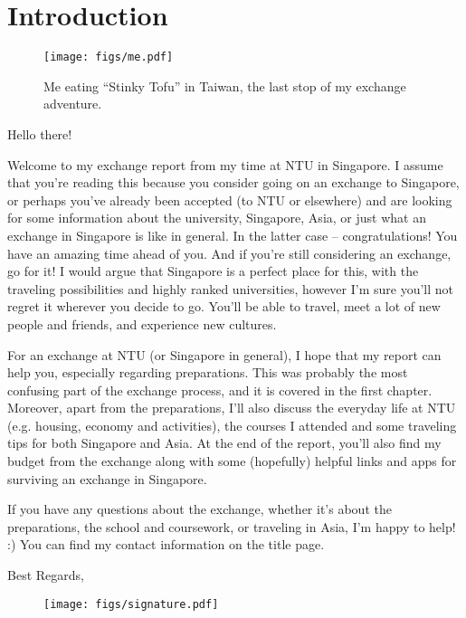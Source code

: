 \chapter*{Introduction}

\begin{wrapfigure}{r}{0.3\textwidth}
    \vspace{0.25cm}
    \centering
    \texttt{[image: figs/me.pdf]}
    \vspace{-0.15cm}
    \caption{Me eating ``Stinky Tofu'' in Taiwan, the last stop of my exchange adventure.}
    \vspace{-0.7cm}
\end{wrapfigure}
Hello there! 

Welcome to my exchange report from my time at NTU in Singapore. I assume that you're reading this because you consider going on an exchange to Singapore, or perhaps you've already been accepted (to NTU or elsewhere) and are looking for some information about the university, Singapore, Asia, or just what an exchange in Singapore is like in general. In the latter case -- congratulations! You have an amazing time ahead of you. And if you're still considering an exchange, go for it! I would argue that Singapore is a perfect place for this, with the traveling possibilities and highly ranked universities, however I'm sure you'll not regret it wherever you decide to go. You'll be able to travel, meet a lot of new people and friends, and experience new cultures.

For an exchange at NTU (or Singapore in general), I hope that my report can help you, especially regarding preparations. This was probably the most confusing part of the exchange process, and it is covered in the first chapter. Moreover, apart from the preparations, I'll also discuss the everyday life at NTU (e.g. housing, economy and activities), the courses I attended and some traveling tips for both Singapore and Asia. At the end of the report, you'll also find my budget from the exchange along with some (hopefully) helpful links and apps for surviving an exchange in Singapore.

If you have any questions about the exchange, whether it's about the preparations, the school and coursework, or traveling in Asia, I'm happy to help! :) You can find my contact information on the title page.

Best Regards, \\
\vspace{-0.9cm}
\begin{wrapfigure}{l}{0.35\textwidth}
    \centering
    \texttt{[image: figs/signature.pdf]}
\end{wrapfigure}
